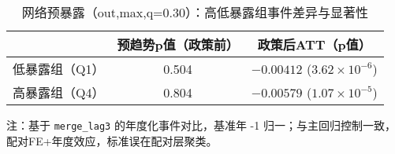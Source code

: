 \begin{table}[htbp]
\centering
\caption{网络预暴露（out,max,q=0.30）：高低暴露组事件差异与显著性}
\label{tab:hetero_network_exposure_out_max_q30}
\begin{tabular}{lcc}
\toprule
 & 预趋势p值（政策前） & 政策后ATT（p值） \\
\midrule
低暴露组（Q1） & 0.504 & $-0.00412$ ($3.62\times 10^{-6}$) \\
高暴露组（Q4） & 0.804 & $-0.00579$ ($1.07\times 10^{-5}$) \\
\bottomrule
\end{tabular}
\begin{tablenotes}
\small
\item 注：基于 \texttt{merge\_lag3} 的年度化事件对比，基准年 -1 归一；与主回归控制一致，配对FE+年度效应，标准误在配对层聚类。
\end{tablenotes}
\end{table}